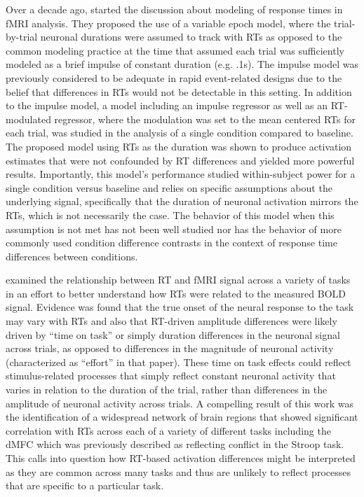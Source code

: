 \documentclass[titlepage,12pt] {article}
\begin{document}
Over a decade ago,  \citet{grinband_detection_2008} started the discussion about modeling of response times in fMRI analysis.  They proposed the use of a variable epoch model, where the trial-by-trial neuronal durations were assumed to track with RTs as opposed to the common modeling practice at the time that assumed each trial was sufficiently modeled as a brief impulse of constant duration (e.g. .1s).  The impulse model was previously considered to be adequate in rapid event-related designs due to the belief that differences in RTs would not be detectable in this setting. In addition to the impulse model, a model including an impulse regressor as well as an RT-modulated regressor, where the modulation was set to the mean centered RTs for each trial, was studied in the analysis of a single condition compared to baseline.  The proposed model using RTs as the duration was shown to produce activation estimates that were not confounded by RT differences and yielded more powerful results.  Importantly, this model's performance studied within-subject power for a single condition versus baseline and relies on specific assumptions about the underlying signal, specifically that the duration of neuronal activation mirrors the RTs, which is not necessarily the case.  The behavior of this model when this assumption is not met has not been well studied nor has the behavior of more commonly used condition difference contrasts in the context of response time differences between conditions.

\citet{yarkoni_bold_2009} examined the relationship between RT and fMRI signal across a variety of tasks in an effort to better understand how RTs were related to the measured BOLD signal.  Evidence was found that the true onset of the neural response to the task may vary with RTs and also that RT-driven amplitude differences were likely driven by ``time on task'' or simply duration differences in the neuronal signal across trials, as opposed to differences in the magnitude of neuronal activity (characterized as ``effort'' in that paper).  These time on task effects could reflect stimulus-related processes that simply reflect constant neuronal activity that varies in relation to the duration of the trial, rather than differences in the amplitude of neuronal activity across trials.  A compelling result of this work was the identification of a widespread network of brain regions that showed significant correlation with RTs across each of a variety of different tasks including the dMFC which was previously described as reflecting conflict in the Stroop task.  This calls into question how RT-based activation differences might be interpreted as they are common across many tasks and thus are unlikely to reflect processes that are specific to a particular task.  
\end{document}
